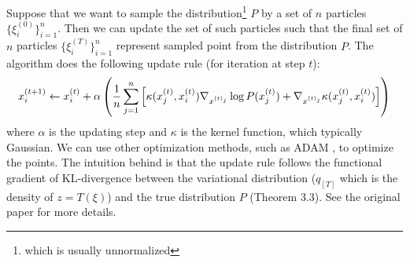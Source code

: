 Suppose that we want to sample the distribution\footnote{which is usually unnormalized} $P$ by a set of $n$ particles $\{\xi^{(0)}_i\}^n_{i=1}$. Then we can update the set of such particles such that the final set of $n$ particles $\{\xi^{(T)}_i\}^n_{i=1}$ represent sampled point from the distribution $P$. The algorithm does the following update rule (for iteration at step $t$): 
\begin{equation}
    x^{(t+1)}_i \leftarrow x^{(t)}_i + \alpha \left( \frac{1}{n}\sum^n_{j=1} \left[ \kappa(x^{(t)}_j, x^{(t)}_i) \nabla_{x^{(t)_j}} \log P(x^{(t)}_j) + \nabla_{x^{(t)_j}} \kappa (x^{(t)}_j, x^{(t)}_i)  \right] \right)
\end{equation}
where $\alpha$ is the updating step and $\kappa$ is the kernel function, which typically Gaussian. We can use other optimization methods, such as ADAM \cite{kingma2014adam}, to optimize the points. The intuition behind is that the update rule follows the functional gradient of KL-divergence between the variational distribution ($q_{[T]}$ which is the density of $z = T(\xi)$) and the true distribution $P$ (Theorem 3.3). See the original paper for more details.


